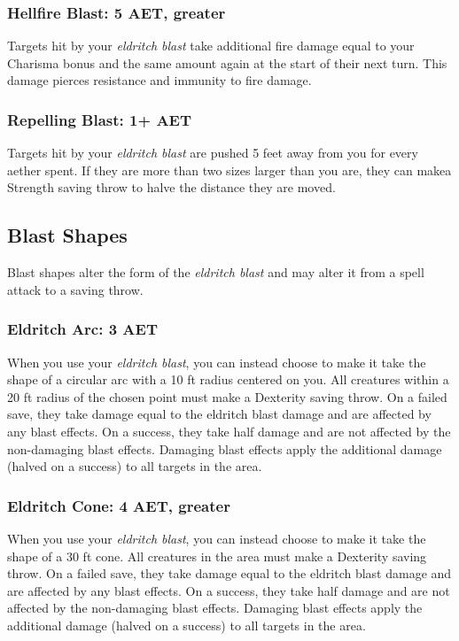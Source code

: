 \subsubsection{Hellfire Blast: 5 AET, greater}
Targets hit by your \textit{eldritch blast} take additional fire damage equal to your Charisma bonus and the same amount again at the start of their next turn. This damage pierces resistance and immunity to fire damage.

\subsubsection{Repelling Blast: 1+ AET}
Targets hit by your \textit{eldritch blast} are pushed 5 feet away from you for every aether spent. If they are more than two sizes larger than you are, they can makea Strength saving throw to halve the distance they are moved.

\subsection{Blast Shapes}
Blast shapes alter the form of the \textit{eldritch blast} and may alter it from a spell attack to a saving throw.

\subsubsection{Eldritch Arc: 3 AET}
When you use your \textit{eldritch blast}, you can instead choose to make it take the shape of a circular arc with a 10 ft radius centered on you. All creatures within a 20 ft radius of the chosen point must make a Dexterity saving throw. On a failed save, they take damage equal to the eldritch blast damage and are affected by any blast effects. On a success, they take half damage and are not affected by the non-damaging blast effects. Damaging blast effects apply the additional damage (halved on a success) to all targets in the area.

\subsubsection{Eldritch Cone: 4 AET, greater}
When you use your \textit{eldritch blast}, you can instead choose to make it take the shape of a 30 ft cone. All creatures in the area must make a Dexterity saving throw. On a failed save, they take damage equal to the eldritch blast damage and are affected by any blast effects. On a success, they take half damage and are not affected by the non-damaging blast effects. Damaging blast effects apply the additional damage (halved on a success) to all targets in the area.

